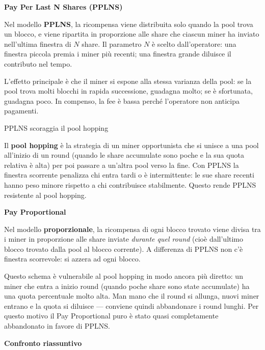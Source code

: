 \documentclass[
  italian,
  openany]{book}
\begin{document}
\textbf{Pay Per Last N Shares (PPLNS)}

Nel modello \textbf{PPLNS}, la ricompensa viene distribuita solo quando
la pool trova un blocco, e viene ripartita in proporzione alle share che
ciascun miner ha inviato nell'ultima finestra di \(N\) share. Il
parametro \(N\) è scelto dall'operatore: una finestra piccola premia i
miner più recenti; una finestra grande diluisce il contributo nel tempo.

L'effetto principale è che il miner si espone alla stessa varianza della
pool: se la pool trova molti blocchi in rapida successione, guadagna
molto; se è sfortunata, guadagna poco. In compenso, la fee è bassa
perché l'operatore non anticipa pagamenti.

\begin{callouttip}{PPLNS scoraggia il pool hopping}

Il \textbf{pool hopping} è la strategia di un miner opportunista che si
unisce a una pool all'inizio di un round (quando le share accumulate
sono poche e la sua quota relativa è alta) per poi passare a un'altra
pool verso la fine. Con PPLNS la finestra scorrente penalizza chi entra
tardi o è intermittente: le sue share recenti hanno peso minore rispetto
a chi contribuisce stabilmente. Questo rende PPLNS resistente al pool
hopping.

\end{callouttip}

\textbf{Pay Proportional}

Nel modello \textbf{proporzionale}, la ricompensa di ogni blocco trovato
viene divisa tra i miner in proporzione alle share inviate \emph{durante
quel round} (cioè dall'ultimo blocco trovato dalla pool al blocco
corrente). A differenza di PPLNS non c'è finestra scorrevole: si azzera
ad ogni blocco.

Questo schema è vulnerabile al pool hopping in modo ancora più diretto:
un miner che entra a inizio round (quando poche share sono state
accumulate) ha una quota percentuale molto alta. Man mano che il round
si allunga, nuovi miner entrano e la quota si diluisce --- conviene
quindi abbandonare i round lunghi. Per questo motivo il Pay Proportional
puro è stato quasi completamente abbandonato in favore di PPLNS.

\textbf{Confronto riassuntivo}
\end{document}
